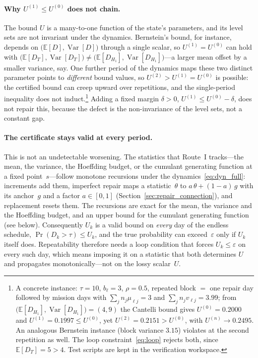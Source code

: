 \documentclass[11pt,a4paper]{article}
\theoremstyle{plain}
\theoremstyle{definition}
\theoremstyle{remark}
\begin{document}
\paragraph{Why $U^{(1)} \le U^{(0)}$ does not chain.}
The bound $U$ is a many-to-one function of the state's parameters, and its level sets are not invariant under the dynamics.
Bernstein's bound, for instance, depends on $\big(\mathbb{E}[D],\operatorname{Var}[D]\big)$ through a single scalar, so $U^{(1)} = U^{(0)}$ can hold with $\big(\mathbb{E}[D_T],\operatorname{Var}[D_T]\big) \ne \big(\mathbb{E}[D_{H_1}],\operatorname{Var}[D_{H_1}]\big)$---a larger mean offset by a smaller variance, say.
One further period of the dynamics maps these two distinct parameter points to \emph{different} bound values, so $U^{(2)} > U^{(1)} = U^{(0)}$ is possible: the certified bound can creep upward over repetitions, and the single-period inequality does not induct.\footnote{A concrete instance: $\tau = 10$, $b_\ell = 3$, $\rho = 0.5$, repeated block $=$ one repair day followed by mission days with $\sum_j n_j\mu_{\ell j} = 3$ and $\sum_j n_j v_{\ell j} = 3.99$; from $\bigl(\mathbb{E}[D_{H_1}],\operatorname{Var}[D_{H_1}]\bigr) = (4,9)$ the Cantelli bound gives $U^{(0)} = 0.2000$ and $U^{(1)} = 0.1997 \le U^{(0)}$, yet $U^{(2)} = 0.2151 > U^{(0)}$, with $U^{(n)} \to 0.2495$. An analogous Bernstein instance (block variance $3.15$) violates at the second repetition as well. The loop constraint~\eqref{eq:loop} rejects both, since $\mathbb{E}[D_T] = 5 > 4$. Test scripts are kept in the verification workspace.}
Adding a fixed margin $\delta > 0$, $U^{(1)} \le U^{(0)} - \delta$, does not repair this, because the defect is the non-invariance of the level sets, not a constant gap.

\paragraph{The certificate stays valid at every period.}
This is not an undetectable worsening.
The statistics that Route~I tracks---the mean, the variance, the Hoeffding budget, or the cumulant generating function at a fixed point~$s$---follow monotone recursions under the dynamics~\eqref{eq:dyn_full}: increments add them, imperfect repair maps a statistic~$\theta$ to $a\,\theta + (1-a)\,g$ with its anchor~$g$ and a factor $a \in [0,1]$ (Section~\ref{sec:repair_connection}), and replacement resets them.
The recursions are exact for the mean, the variance and the Hoeffding budget, and an upper bound for the cumulant generating function (see below).
Consequently $U_k$ is a valid bound on \emph{every} day of the endless schedule, $\Pr(D_k > \tau) \le U_k$, and the true probability can exceed~$\varepsilon$ only if $U_k$ itself does.
Repeatability therefore needs a loop condition that forces $U_k \le \varepsilon$ on every such day, which means imposing it on a statistic that both determines $U$ and propagates monotonically---not on the lossy scalar~$U$.
\end{document}

